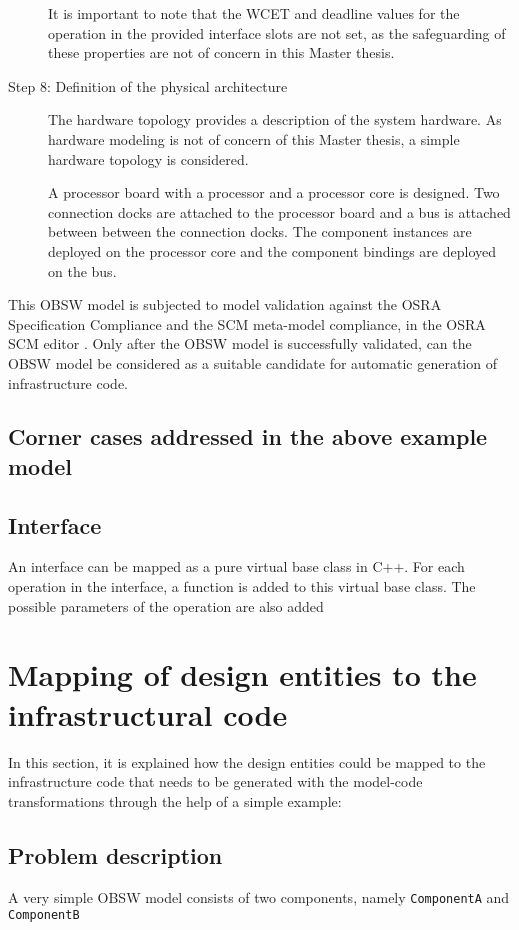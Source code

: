 \begin{description}
It is important to note that the WCET and deadline values for the operation in the provided interface slots are not set, as the safeguarding of these properties are not of concern in this Master thesis. 

\item [Step 8: Definition of the physical architecture] The hardware topology provides a description of the system hardware. As hardware modeling is not of concern of this Master thesis, a simple hardware topology is considered. 

A processor board with a processor and a processor core is designed. Two connection docks are attached to the processor board and a bus is attached between between the connection docks. The component instances are deployed on the processor core and the component bindings are deployed on the bus. 
\end{description}

This OBSW model is subjected to model validation against the OSRA Specification Compliance and the SCM meta-model compliance, in the OSRA SCM editor \cite{OSRAEditor}. Only after the OBSW model is successfully validated, can the OBSW model be considered as a suitable candidate for automatic generation of infrastructure code.  

\subsection{Corner cases addressed in the above example model}
   
\subsection{Interface}
An interface can be mapped as a pure virtual base class in C++. For each operation in the interface, a function is added to this virtual base class. The possible parameters of the operation are also added   

\section{Mapping of design entities to the infrastructural code}    
In this section, it is explained how the design entities could be mapped to the infrastructure code that needs to be generated with the model-code transformations through the help of a simple example:

\subsection{Problem description}
A very simple OBSW model consists of two components, namely \texttt{ComponentA} and \texttt{ComponentB} 

